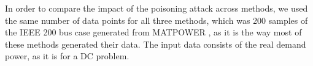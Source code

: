 
In order to compare the impact of the poisoning attack across methods, we used the same number of data points for all three methods, which was 200 samples of the IEEE 200 bus case generated from MATPOWER \cite{matpow2011}, as it is the way most of these methods generated their data. The input data consists of the real demand power, as it is for a DC problem.
